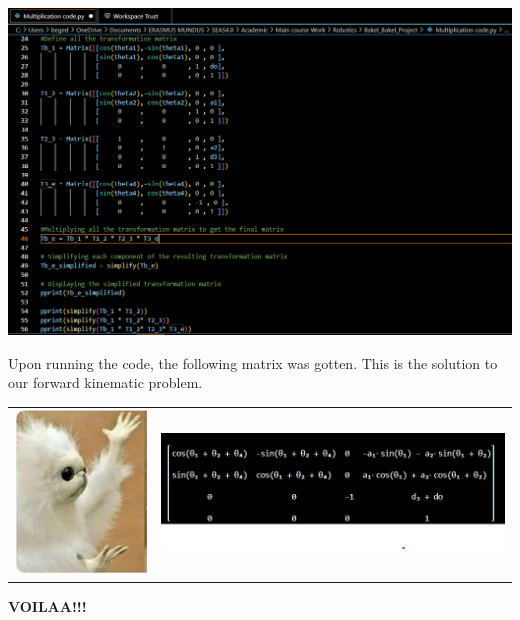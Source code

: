 \documentclass[12pt]{report}
\begin{document}
	\hspace{-20mm} 
	\includegraphics[scale = 0.71]{P2}

Upon running the code, the following matrix was gotten. This is the solution to our forward kinematic problem.

\hspace{-15mm}
\begin{tabular}{cc}
	\includegraphics[scale=0.3]{voila} & 
	\includegraphics[scale= 1.1]{P3}  \\

\end{tabular}
	\begin{center}

	\textbf{VOILAA!!!}
\end{center}
\end{document}
